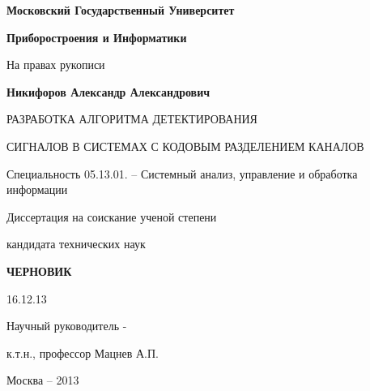 \noindent\centerline{\bf{Московский Государственный Университет}}
\noindent\centerline{\bf{Приборостроения и Информатики}}
\vspace{\baselineskip}
\vspace{\baselineskip}

\hfill На правах рукописи

\vspace{\baselineskip}
\vspace{\baselineskip}

\noindent\centerline{\bf{Никифоров Александр Александрович}}

\vspace{\baselineskip}
\vspace{\baselineskip}

\noindent\centerline{РАЗРАБОТКА АЛГОРИТМА ДЕТЕКТИРОВАНИЯ}
\noindent\centerline{СИГНАЛОВ В СИСТЕМАХ С КОДОВЫМ РАЗДЕЛЕНИЕМ КАНАЛОВ}

\vspace{\baselineskip}
\vspace{\baselineskip}

\noindent\centerline{Специальность 05.13.01. – Системный анализ, управление и обработка информации}

\vspace{\baselineskip}
\vspace{\baselineskip}

\noindent\centerline{Диссертация на соискание ученой степени}
\noindent\centerline{кандидата технических наук}


\vspace{\baselineskip}
\vspace{\baselineskip}
\noindent\centerline{\bf{ЧЕРНОВИК}}
\noindent\centerline{16.12.13}

\vspace{\baselineskip}
\vspace{\baselineskip}

\hfill{Научный руководитель -}

\hfill{к.т.н., профессор Мацнев А.П.}

\vfill
\noindent\centerline{Москва – 2013}

\newpage
